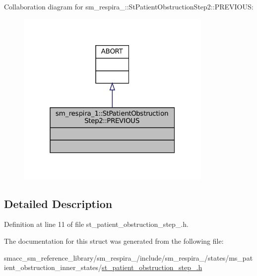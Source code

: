 Collaboration diagram for sm\+\_\+respira\+\_\+:\+:St\+Patient\+Obstruction\+Step2\+:\+:P\+R\+E\+V\+I\+O\+US\+:
\nopagebreak
\begin{figure}[H]
\begin{center}
\leavevmode
\includegraphics[width=268pt]{structsm__respira__1_1_1StPatientObstructionStep2_1_1PREVIOUS__coll__graph}
\end{center}
\end{figure}


\subsection{Detailed Description}


Definition at line 11 of file st\+\_\+patient\+\_\+obstruction\+\_\+step\+\_.\+h.



The documentation for this struct was generated from the following file\+:\begin{DoxyCompactItemize}
\item 
smacc\+\_\+sm\+\_\+reference\+\_\+library/sm\+\_\+respira\+\_/include/sm\+\_\+respira\+\_/states/ms\+\_\+patient\+\_\+obstruction\+\_\+inner\+\_\+states/\hyperlink{st__patient__obstruction__step__2_8h}{st\+\_\+patient\+\_\+obstruction\+\_\+step\+\_.\+h}\end{DoxyCompactItemize}
